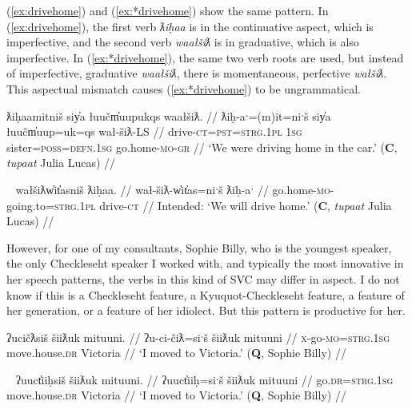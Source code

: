 (\ref{ex:drivehome}) and (\ref{ex:*drivehome}) show the same pattern. In (\ref{ex:drivehome}), the first verb \textit{ƛiḥaa} is in the continuative aspect, which is imperfective, and the second verb \textit{waałšiƛ} is in graduative, which is also imperfective. In (\ref{ex:*drivehome}), the same two verb roots are used, but instead of imperfective, graduative \textit{waałšiƛ}, there is momentaneous, perfective \textit{wałšiƛ}. This aspectual mismatch causes (\ref{ex:*drivehome}) to be ungrammatical.

\ex \label{ex:drivehome}
\begingl
\glpreamble ƛiḥaamitniš siy̓a łuučm̓uupukqs waałšiƛ. //
\gla ƛiḥ-aˑ=(m)it=niˑš siy̓a łuučm̓uup=uk=qs wał-šiƛ-LS //
\glb drive-\textsc{ct}=\textsc{pst}=\textsc{strg.1pl} \textsc{1sg} sister=\textsc{poss}=\textsc{defn.1sg} go.home-\textsc{mo}-\textsc{gr} //
\glft `We were driving home in the car.' (\textbf{C}, \textit{tupaat} Julia Lucas) //
\endgl
\xe

\ex~ \label{ex:*drivehome}
\begingl
\glpreamble *wałšiƛw̓it̓asniš ƛiḥaa. //
\gla wał-šiƛ-w̓it̓as=niˑš ƛiḥ-aˑ //
\glb go.home-\textsc{mo}-going.to=\textsc{strg.1pl} drive-\textsc{ct} //
\glft Intended: `We will drive home.' (\textbf{C}, \textit{tupaat} Julia Lucas) //
\endgl
\xe

However, for one of my consultants, Sophie Billy, who is the youngest speaker, the only Checkleseht speaker I worked with, and typically the most innovative in her speech patterns, the verbs in this kind of SVC may differ in aspect. I do not know if this is a Checkleseht feature, a Kyuquot-Checkleseht feature, a feature of her generation, or a feature of her idiolect. But this pattern is productive for her.

\ex \label{ex:movetovictoria1}
\begingl
\glpreamble ʔucičƛsiš šiiƛuk mituuni. //
\gla ʔu-ci-čiƛ=siˑš šiiƛuk mituuni  //
\glb \textsc{x}-go-\textsc{mo}=\textsc{strg.1sg} move.house.\textsc{dr} Victoria //
\glft `I moved to Victoria.' (\textbf{Q}, Sophie Billy) //
\endgl
\xe

\ex~ \label{ex:movetovictoria2}
\begingl
\glpreamble ʔuuct̓iiḥsiš šiiƛuk mituuni. //
\gla ʔuuct̓iiḥ=siˑš šiiƛuk mituuni  //
\glb go.\textsc{dr}=\textsc{strg.1sg} move.house.\textsc{dr} Victoria //
\glft `I moved to Victoria.' (\textbf{Q}, Sophie Billy) //
\endgl
\xe

\begin{comment}
Ordering preference. One of my speakers expressed a strong preference for the manner verb to precede the action. This mirrors how adverbs are used in Nuuchahnulth, which also tend to precede the verb. Other speakers I consulted with were comfortable with the verbs coming in either order.

\ex \label{ex:gohomedrive}
\begingl
\glpreamble ʔucičƛsiš šiiƛuk mituuni. //
\gla ʔu-ci-čiƛ=siˑš šiiƛuk mituuni  //
\glb \textsc{x}-go-\textsc{mo}=\textsc{strg.1sg} move.house-\textsc{dr} Victoria //
\glft `I moved to Victoria.' (\textbf{Q}, Sophie Billy) //
\endgl
\xe
FH
*waałšiʔaƛs ƛiiƛiiḥataḥ.
waałšiʔaƛs. ƛiiƛiiḥataḥʔaƛs.
\end{comment}

